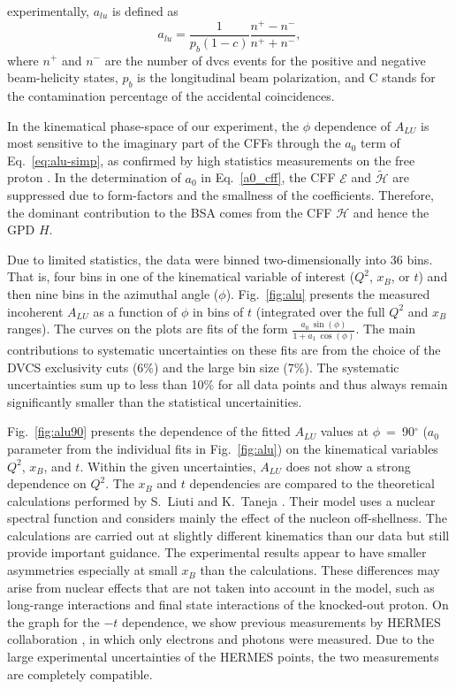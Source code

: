 \documentclass[twocolumn,nofootinbib,prl,superscriptaddress,secnumarabic,amssymb,nobibnotes,aps,floatfix]{revtex4}
\begin{document}

experimentally, $a_{lu}$ is defined as
\begin{equation}
   a_{lu} = \frac{1}{p_{b}(1-c)} \frac{n^{+} - n^{-}}{n^{+} + n^{-} },
\end{equation}
where $n^{+}$ and $n^{-}$ are the number of dvcs events for the positive and 
negative beam-helicity states, $p_{b}$ is the longitudinal beam polarization, 
and C stands for the contamination percentage of the accidental coincidences.  

In the kinematical phase-space of our experiment, the $\phi$ dependence of 
$A_{LU}$ is most sensitive to the imaginary part of the CFFs through the $a_0$ 
term of Eq.~\ref{eq:alu-simp}, as confirmed by high statistics measurements on 
the free proton \cite{Girod:2007aa,Jo:2015ema}. In the determination of $a_0$ 
in Eq.~\ref{a0_cff}, the CFF $\mathcal{E}$ and $\mathcal{\tilde {H}}$ are 
suppressed due to form-factors and the smallness of the coefficients.  
Therefore, the dominant contribution to the BSA comes from the CFF 
$\mathcal{H}$ and hence the GPD $H$.

Due to limited statistics, the data were binned two-dimensionally into 36 bins.  
That is, four bins in one of the kinematical variable of interest ($Q^{2}$, 
$x_{B}$, or $t$) and then nine bins in the azimuthal angle ($\phi$).   
Fig.~\ref{fig:alu} presents the measured incoherent $A_{LU}$ as a function of 
$\phi$ in bins of $t$ (integrated over the full $Q^{2}$ and $x_{B}$ ranges).  
The curves on the plots are fits of the form $\frac{a_{0}~\sin(\phi)}{1+ 
a_{1}~\cos(\phi)}$. The main contributions to systematic uncertainties on these fits are from the choice of 
the DVCS exclusivity cuts (6\%) and the large bin size (7\%). The systematic 
uncertainties sum up to less than 10\% for all data points and thus always 
remain significantly smaller than the statistical uncertainities.


Fig.~\ref{fig:alu90} presents the dependence of the fitted $A_{LU}$ values at 
$\phi$~=~90$^{\circ}$ ($a_{0}$ parameter from the individual fits in 
Fig.~\ref{fig:alu}) on the kinematical variables $Q^2$, $x_{B}$, and $t$.  
Within the given uncertainties, $A_{LU}$ does not show a strong dependence on 
$Q^2$.  The $x_{B}$ and $t$ dependencies are compared to the theoretical 
calculations performed by S.~Liuti and K.~Taneja \cite{simonetta_2}. Their 
model uses a nuclear spectral function and considers mainly the effect of the 
nucleon off-shellness. The calculations are carried out at slightly different 
kinematics than our data but still provide important guidance. The experimental 
results appear to have smaller asymmetries especially at small $x_{B}$ than the 
calculations.  These differences may arise from nuclear effects that are not 
taken into account in the model, such as long-range interactions and final 
state interactions of the knocked-out proton. On the graph for the $-t$ 
dependence, we show previous measurements by HERMES collaboration 
\cite{Airapetian:2009cga}, in which only electrons and photons were measured.  
Due to the large experimental uncertainties of the HERMES points, the two 
measurements are completely compatible.
\end{document}
